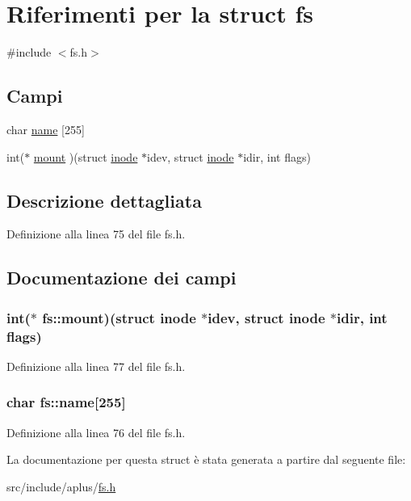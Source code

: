 \hypertarget{structfs}{\section{Riferimenti per la struct fs}
\label{structfs}
}


{\ttfamily \#include $<$fs.\+h$>$}

\subsection*{Campi}
\begin{DoxyCompactItemize}
\item 
char \hyperlink{structfs_a7d1c966e58722afdf537c5d7bc0790c7}{name} \mbox{[}255\mbox{]}
\item 
int($\ast$ \hyperlink{structfs_a6ae33214a489b396e834ac7e028d859c}{mount} )(struct \hyperlink{structinode}{inode} $\ast$idev, struct \hyperlink{structinode}{inode} $\ast$idir, int flags)
\end{DoxyCompactItemize}


\subsection{Descrizione dettagliata}


Definizione alla linea 75 del file fs.\+h.



\subsection{Documentazione dei campi}
\hypertarget{structfs_a6ae33214a489b396e834ac7e028d859c}{
\subsubsection[{mount}]{\setlength{\rightskip}{0pt plus 5cm}int($\ast$ fs\+::mount)(struct {\bf inode} $\ast$idev, struct {\bf inode} $\ast$idir, int flags)}}\label{structfs_a6ae33214a489b396e834ac7e028d859c}


Definizione alla linea 77 del file fs.\+h.

\hypertarget{structfs_a7d1c966e58722afdf537c5d7bc0790c7}{
\subsubsection[{name}]{\setlength{\rightskip}{0pt plus 5cm}char fs\+::name\mbox{[}255\mbox{]}}}\label{structfs_a7d1c966e58722afdf537c5d7bc0790c7}


Definizione alla linea 76 del file fs.\+h.



La documentazione per questa struct è stata generata a partire dal seguente file\+:\begin{DoxyCompactItemize}
\item 
src/include/aplus/\hyperlink{fs_8h}{fs.\+h}\end{DoxyCompactItemize}
